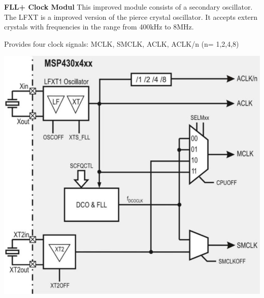 \vspace{0.5cm}
\begin{minipage}{0.585\linewidth}
    \textbf{FLL+ Clock Modul}\newline
    This improved module consists of a secondary oscillator.\newline
    The LFXT is a improved version of the pierce crystal oscillator. It accepts extern crystals with frequencies in the range from 400kHz to 8MHz.\newline\newline
    
    Provides four clock signals:\newline
    MCLK, SMCLK, ACLK, ACLK/n (n= 1,2,4,8)
\end{minipage}
\begin{minipage}{0.41\linewidth}
\includegraphics[width=0.8\linewidth]{images/FLLpClock} 
\end{minipage}

